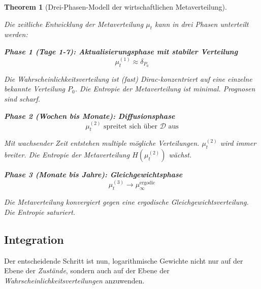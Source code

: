 \documentclass[a4paper, 12pt, twoside, openright]{report}
\newtheorem{theorem}{Theorem}[section]
\theoremstyle{definition}
\theoremstyle{definition}
\begin{document}
\begin{theorem}[Drei-Phasen-Modell der wirtschaftlichen Metaverteilung]
\label{thm:three_phases_meta}

Die zeitliche Entwicklung der Metaverteilung $\mu_t$ kann in drei Phasen unterteilt werden:

\textbf{Phase 1 (Tage 1-7): Aktualisierungsphase mit stabiler Verteilung}
\begin{equation}
\mu_t^{(1)} \approx \delta_{P_0}
\end{equation}

Die Wahrscheinlichkeitsverteilung ist (fast) Dirac-konzentriert auf eine einzelne bekannte Verteilung $P_0$. Die Entropie der Metaverteilung ist minimal. Prognosen sind scharf.

\textbf{Phase 2 (Wochen bis Monate): Diffusionsphase}
\begin{equation}
\mu_t^{(2)} \text{ spreitet sich über } \mathcal{D} \text{ aus}
\end{equation}

Mit wachsender Zeit entstehen multiple mögliche Verteilungen. $\mu_t^{(2)}$ wird immer breiter. Die Entropie der Metaverteilung $H(\mu_t^{(2)})$ wächst.

\textbf{Phase 3 (Monate bis Jahre): Gleichgewichtsphase}
\begin{equation}
\mu_t^{(3)} \to \mu_{\infty}^{\text{ergodic}}
\end{equation}

Die Metaverteilung konvergiert gegen eine ergodische Gleichgewichtsverteilung. Die Entropie saturiert.
\end{theorem}

\subsection{Integration}

Der entscheidende Schritt ist nun, logarithmische Gewichte nicht nur auf der Ebene der \emph{Zustände}, sondern auch auf der Ebene der \emph{Wahrscheinlichkeitsverteilungen} anzuwenden.
\end{document}
